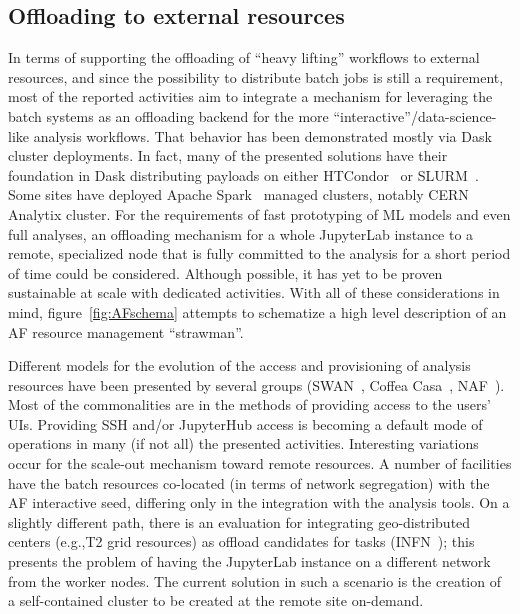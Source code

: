 \subsection*{Offloading to external resources}
In terms of supporting the offloading of “heavy lifting” workflows to external resources, and since the possibility to distribute batch jobs is still a requirement, most of the reported activities aim to integrate a mechanism for leveraging the batch systems as an offloading backend for the more “interactive”/data-science-like analysis workflows. That behavior has been demonstrated mostly via Dask cluster deployments. In fact, many of the presented solutions have their foundation in Dask distributing payloads on either HTCondor~\cite{htcondor} or SLURM~\cite{slurm}. Some sites have deployed Apache Spark~\cite{spark} managed clusters, notably CERN Analytix cluster. For the requirements of fast prototyping of ML models and even full analyses, an offloading mechanism for a whole JupyterLab instance to a remote, specialized node that is fully committed to the analysis for a short period of time could be considered. Although possible, it has yet to be proven sustainable at scale with dedicated activities. With all of these considerations in mind,  figure~\ref{fig:AFschema} attempts to schematize a high level description of an AF resource management “strawman”. 

Different models for the evolution of the access and provisioning of analysis resources have been presented by several groups (SWAN~\cite{swan}, Coffea Casa~\cite{coffea}, NAF~\cite{NAF}). Most of the commonalities are in the methods of providing access to the users’ UIs. Providing SSH and/or JupyterHub access is becoming a default mode of operations in many (if not all) the presented activities. Interesting variations occur for the scale-out mechanism toward remote resources. A number of facilities have the batch resources co-located (in terms of network segregation) with the AF interactive seed, differing only in the integration with the analysis tools. On a slightly different path, there is an evaluation for integrating geo-distributed centers (e.g.,T2 grid resources) as offload candidates for tasks (INFN~\cite{INFN_distributed}); this presents the problem of having the JupyterLab instance on a different network from the worker nodes. The current solution in such a scenario is the creation of a self-contained cluster to be created at the remote site on-demand. 

